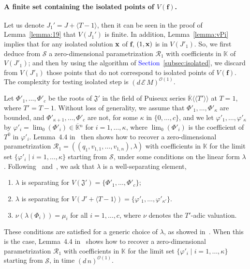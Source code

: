 \documentclass[11pt]{article}
\numberwithin{Property}{section}
\numberwithin{Theorem}{section}
\numberwithin{Proposition}{section}
\numberwithin{Lemma}{section}
\numberwithin{Corollary}{section}
\numberwithin{Definition}{section}
\numberwithin{Remark}{section}
\numberwithin{Conjecture}{section}
\numberwithin{Problem}{section}
\numberwithin{Claim}{section}
\theoremstyle{definition}
\numberwithin{Example}{section}
\def\f {\ensuremath{\mathbf{f}}}
\def\bar{\overline}
\newcommand{\bigO}[1]{\mathcal{O}(#1)} %
\newcommand{\field}{\mathbb{K}} %
\newcommand{\improve}[1]{\textcolor{blue}{#1}} %
\begin{document}
\paragraph{A finite set containing the isolated points of $V(\f)$.} Let us denote $J_1' = J + \langle T -1 \rangle$, then it can be seen in the proof of Lemma~\ref{lemma:19} that $V(J_1')$ is finite. In addition, Lemma~\ref{lemma:vPi} implies that for any isolated solution ${\bf x}$ of $\f$, $(1,{\bf x})$ is in $V(J'_1)$. So, we first deduce from $\mathscr{S}$ a zero-dimensional parametrization $\mathscr{R}_1$ with coefficients in $\field$
of $V(J'_1)$; and then by using the algorithm of \improve{Section~\ref{subsec:isolated}}, we discard from $V(J'_1)$ those points that do not correspond to isolated points of $V(\f)$. The complexity for testing isolated step is $(d\,\mathcal{E}\,M)^{\bigO{1}}$.

Let $\Phi'_1,\dots,\Phi'_c$ be the roots of $\mathfrak{J}'$ in the field of Puiseux series $\bar{\field}\langle\langle T'\rangle\rangle$ at $T=1$, where $T' = T-1$. Without loss of generality, we assume that
$\Phi'_1,\dots,\Phi'_\kappa$ are bounded, and
$\Phi'_{\kappa+1},\dots,\Phi'_c$ are not, for some $\kappa$ in
$\{0,\dots,c\}$, and we let $\varphi'_1,\dots,\varphi'_\kappa$ by
$\varphi'_i=\lim_0(\Phi'_i)\in\bar{\field}{}^n$ for
$i=1,\dots,\kappa$, where $\lim_0(\Phi'_i)$ is the coefficient of $T^0$ in $\varphi'_i$. Lemma~4.4 in~\cite{RRS} then shows how to recover a zero-dimensional parametrization
$\mathscr{R}_1=((q_1,v_{1,1},\dots,v_{1,n}),\lambda)$ with coefficients in
$\field$ for the limit set $\{\varphi'_i \mid i=1,\dots,\kappa\}$
starting from $\mathscr{S}$, under some conditions on the linear form
$\lambda$. Following~\cite{RRS} and~\cite{SaSc16}, we ask that $\lambda$ is a {\rm well-separating
  element},
\begin{enumerate}
\item $\lambda$ is separating for $V(\mathfrak{J}')=\{\Phi'_1,\dots,\Phi'_c\}$;
\item $\lambda$ is separating for $V(J' + \langle T-1\rangle) = \{ \varphi'_1,\dots,\varphi'_{\kappa'}\}$.
\item $\nu(\lambda(\Phi_i)) = \mu_i$ for all $i=1,\dots,c$, where $\nu$ denotes
 the $T'$-adic valuation.
\end{enumerate}
These conditions are satisfied for a generic choice of $\lambda$, as
showed in~\cite{SaSc16}. When this is the case, Lemma~4.4
in~\cite{RRS} shows how to recover a zero-dimensional parametrization
$\mathscr{R}_1$ with coefficients in $\field$ for the limit set $\{\varphi'_i \mid i=1,\dots,\kappa\}$
starting from $\mathscr{S}$, in time $(d\,n)^{\mathcal{O}(1)}$.
\end{document}
